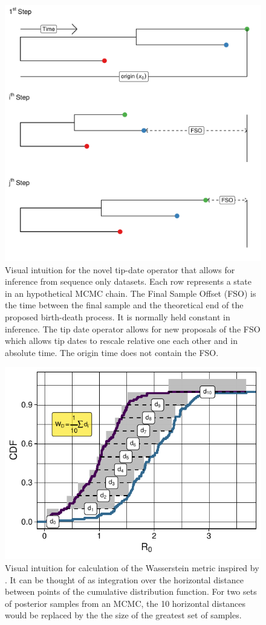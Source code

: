 \documentclass{article}
\begin{document}
\renewcommand{\thefigure}{S\arabic{figure}}
\setcounter{figure}{0}

\begin{figure}[H]
\centering
\includegraphics[width=1\linewidth]{../figures/tipDateOp.pdf}
\caption{Visual intuition for the novel tip-date operator that allows for inference from sequence only datasets. Each row represents a state in an hypothetical MCMC chain. The Final Sample Offset (FSO) is the time between the final sample and the theoretical end of the proposed birth-death process. It is normally held constant in inference. The tip date operator allows for new proposals of the FSO which allows tip dates to rescale relative one each other and in absolute time. The origin time does not contain the FSO.}
\label{fig:tipOp}
\end{figure}

\begin{figure}[H]
\centering
\includegraphics[width=0.5\linewidth]{../figures/wassersteinIntuition.pdf}
\caption{Visual intuition for calculation of the Wasserstein metric inspired by \citet{kolouri_generalized_2019}. It can be thought of as integration over the horizontal distance between points of the cumulative distribution function. For two sets of posterior samples from an MCMC, the 10 horizontal distances would be replaced by the the size of the greatest set of samples.}
\label{fig:wassIntuition}
\end{figure}
\end{document}

